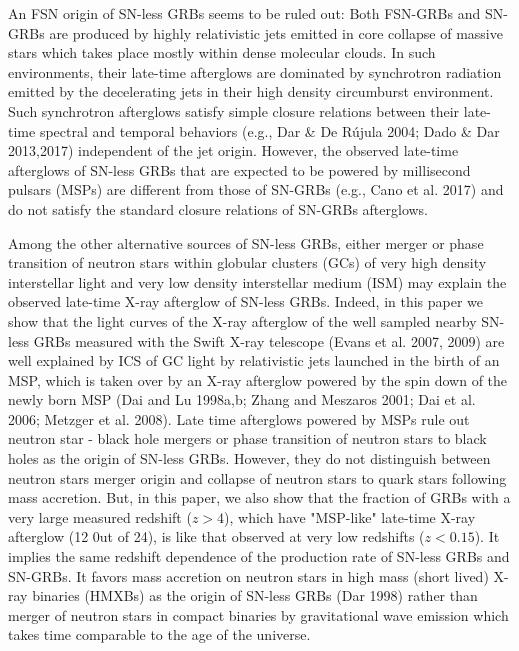 \documentclass[twocolumn]{aastex61}
\begin{document}
An FSN origin of SN-less GRBs seems to be ruled out: Both FSN-GRBs and 
SN-GRBs are produced by highly relativistic jets emitted in core 
collapse of massive stars which takes place mostly within dense 
molecular clouds. In such environments, their late-time afterglows are 
dominated by synchrotron radiation emitted by the decelerating jets in 
their high density circumburst environment. Such synchrotron afterglows 
satisfy simple closure relations between their late-time spectral and 
temporal behaviors (e.g., Dar \& De R\'ujula 2004; Dado \& Dar 
2013,2017) independent of the jet origin. However, the observed late-time 
afterglows of SN-less GRBs that are expected to be powered by millisecond 
pulsars (MSPs) are different from those of 
SN-GRBs (e.g., Cano et al. 2017) and do not satisfy the standard closure 
relations of SN-GRBs afterglows.


Among the other alternative sources of SN-less GRBs, either merger or 
phase transition of neutron stars within globular clusters (GCs) of very high 
density interstellar light and very low density interstellar medium 
(ISM) may explain the observed late-time X-ray afterglow of SN-less 
GRBs. Indeed, in this paper we show that the light curves of the X-ray 
afterglow of the well sampled nearby SN-less GRBs measured with the 
Swift X-ray telescope (Evans et al. 2007, 2009) are well explained by 
ICS of GC light by relativistic jets launched in the birth of an MSP, 
which is taken over by an X-ray afterglow powered by the spin down of 
the newly born MSP (Dai and Lu 1998a,b; Zhang and Meszaros 2001; Dai et 
al. 2006; Metzger et al. 2008). Late time afterglows powered by MSPs 
rule out neutron star - black hole mergers or phase transition of 
neutron stars to black holes as the origin of SN-less GRBs. However, 
they do not distinguish between neutron stars merger origin and 
collapse of neutron stars to quark stars following mass accretion. But, 
in this paper, we also show that the fraction of GRBs with a very large 
measured redshift ($z>4$), which have "MSP-like" late-time X-ray 
afterglow (12 0ut of 24), is like that observed at very low redshifts 
($z<0.15$). It implies the same redshift dependence of the production 
rate of SN-less GRBs and SN-GRBs. It favors mass accretion on neutron 
stars in high mass (short lived) X-ray binaries (HMXBs) as the origin 
of SN-less GRBs (Dar 1998) rather than merger of neutron stars in compact 
binaries by gravitational wave emission which takes time comparable to 
the age of the universe.
 
 
\end{document}
